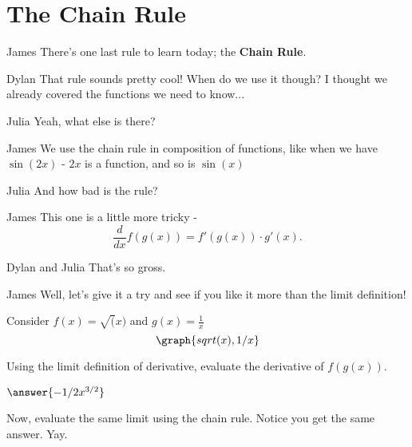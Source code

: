 \documentclass{ximera}
\begin{document}
\section{The Chain Rule}
\begin{dialogue}
\item[James] There's one last rule to learn today; the \textbf{Chain Rule}.
\item[Dylan] That rule sounds pretty cool! When do we use it though? I thought we already covered the functions we need to know...
\item[Julia] Yeah, what else is there?
\item[James] We use the chain rule in composition of functions, like when we have $\sin(2x)$ - $2x$ is a function, and so is $\sin(x)$
\item[Julia] And how bad is the rule?
\item[James] This one is a little more tricky - $$\frac{d}{dx}f(g(x)) = f'(g(x))\cdot g'(x)\text{.}$$
\item[Dylan and Julia] That's so gross.
\item[James] Well, let's give it a try and see if you like it more than the limit definition!
\end{dialogue}
\begin{question}
Consider $f(x) = \sqrt(x)$ and $g(x) = \frac{1}{x}$
\[
\graph{sqrt(x), 1/x}
\]

Using the limit definition of derivative, evaluate the derivative of $f(g(x))$.

$\answer{-1/2x^{3/2}}$

Now, evaluate the same limit using the chain rule. Notice you get the same answer. Yay.

\end{question}
\end{document}
